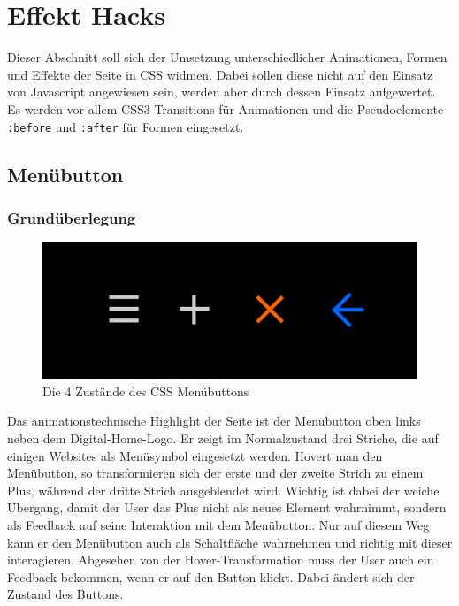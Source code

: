 \section{Effekt Hacks}

Dieser Abschnitt soll sich der Umsetzung unterschiedlicher Animationen, Formen und Effekte der Seite in CSS widmen. Dabei sollen diese nicht auf den Einsatz von Javascript angewiesen sein, werden aber durch dessen Einsatz aufgewertet.
Es werden vor allem CSS3-Transitions für Animationen und die Pseudoelemente \lstinline{:before} und \lstinline{:after} für Formen eingesetzt.
\subsection{Menübutton}
\subsubsection{Grundüberlegung}

\begin{figure} [h]
\includegraphics[width=\textwidth]{./img/css_buttons1.png}
\caption{Die 4 Zustände des CSS Menübuttons}
\label{css_buttons1}
\end{figure}

Das animationstechnische Highlight der Seite ist der Menübutton oben links neben dem Digital-Home-Logo. Er zeigt im Normalzustand drei Striche, die auf einigen Websites als Menüsymbol eingesetzt werden. Hovert man den Menübutton, so transformieren sich der erste und der zweite Strich zu einem Plus, während der dritte Strich ausgeblendet wird. Wichtig ist dabei der weiche Übergang, damit der User das Plus nicht als neues Element wahrnimmt, sondern als Feedback auf seine Interaktion mit dem Menübutton. Nur auf diesem Weg kann er den Menübutton auch als Schaltfläche wahrnehmen und richtig mit dieser interagieren. Abgesehen von der Hover-Transformation muss der User auch ein Feedback bekommen, wenn er auf den Button klickt. Dabei ändert sich der Zustand des Buttons.

